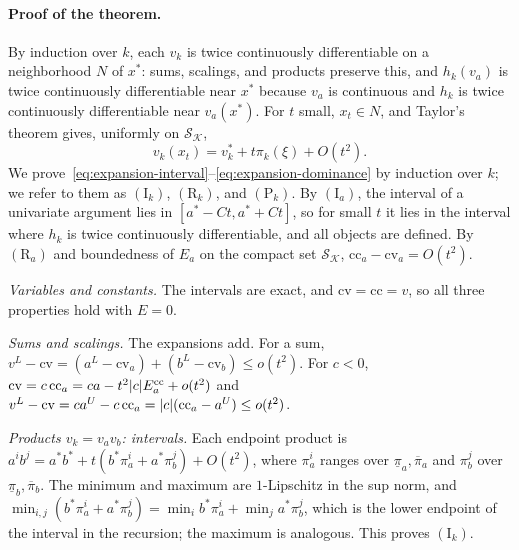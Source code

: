 \paragraph{Proof of the theorem.}
By induction over $k$, each $v_k$ is twice continuously differentiable on a
neighborhood $N$ of $x^*$: sums, scalings, and products preserve this, and
$h_k(v_a)$ is twice continuously differentiable near $x^*$ because $v_a$ is
continuous and $h_k$ is twice continuously differentiable near $v_a(x^*)$.
For $t$ small, $x_t\in N$, and Taylor's theorem gives, uniformly on
$\mathcal S_{\mathcal K}$,
\begin{equation}\label{eq:taylor-factor}
  v_k(x_t)=v_k^*+t\pi_k(\xi)+O(t^2).
\end{equation}
We prove~\eqref{eq:expansion-interval}--\eqref{eq:expansion-dominance} by
induction over $k$; we refer to them as $(\mathrm I_k)$, $(\mathrm R_k)$, and
$(\mathrm P_k)$. By $(\mathrm I_a)$, the interval of a univariate argument
lies in $[a^*-Ct,a^*+Ct]$, so for small $t$ it lies in the interval where
$h_k$ is twice continuously differentiable, and all objects are defined.
By $(\mathrm R_a)$ and boundedness of $E_a$ on the compact set
$\mathcal S_{\mathcal K}$, $\mathrm{cc}_a-\mathrm{cv}_a=O(t^2)$.

\emph{Variables and constants.} The intervals are exact, and
$\mathrm{cv}=\mathrm{cc}=v$, so all three properties hold with $E=0$.

\emph{Sums and scalings.} The expansions add. For a sum,
$v^L-\mathrm{cv}=(a^L-\mathrm{cv}_a)+(b^L-\mathrm{cv}_b)\le o(t^2)$. For $c<0$,
$\mathrm{cv}=c\,\mathrm{cc}_a=ca-t^2\lvert c\rvert E_a^{\mathrm{cc}}+o(t^2)$ and
$v^L-\mathrm{cv}=ca^U-c\,\mathrm{cc}_a=\lvert c\rvert(\mathrm{cc}_a-a^U)\le o(t^2)$.

\emph{Products $v_k=v_av_b$: intervals.} Each endpoint product is
$a^ib^j=a^*b^*+t(b^*\pi_a^i+a^*\pi_b^j)+O(t^2)$, where $\pi_a^i$ ranges over
$\underline\pi_a,\overline\pi_a$ and $\pi_b^j$ over
$\underline\pi_b,\overline\pi_b$. The minimum and maximum are
$1$-Lipschitz in the sup norm, and
$\min_{i,j}(b^*\pi_a^i+a^*\pi_b^j)=\min_ib^*\pi_a^i+\min_ja^*\pi_b^j$, which
is the lower endpoint of the interval in the recursion; the maximum is
analogous. This proves $(\mathrm I_k)$.

